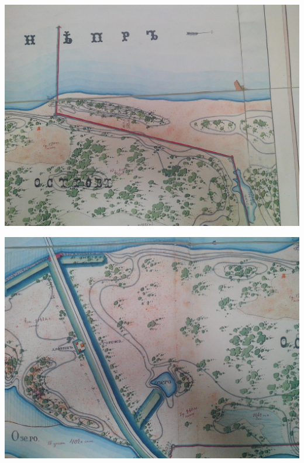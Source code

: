 \begin{center}
\includegraphics[width=\linewidth]{chast-vosp/zver/IMG_20170627_153855.jpg}
\end{center}

\begin{center}
\includegraphics[width=\linewidth]{chast-vosp/zver/IMG_20170627_153908.jpg}
\end{center}

